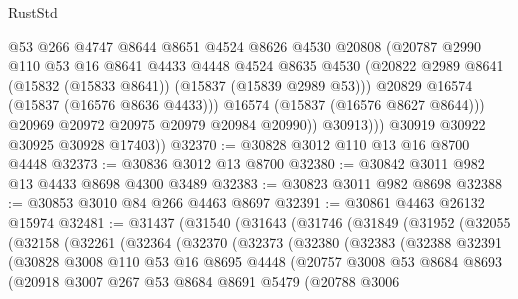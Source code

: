 \begin{lexlean}{RustStd}
\begin{coremodule}
                    @53
                    @266
                    @4747
                    @8644
                    @8651
                    @4524
                    @8626
                    @4530
                    @20808
                    (@20787
                      @2990
                      @110
                      @53
                      @16
                      @8641
                      @4433
                      @4448
                      @4524
                      @8635
                      @4530
                      (@20822 @2989 @8641 (@15832 (@15833 @8641)) (@15837 (@15839 @2989 @53)))
                      @20829
                      @16574
                      (@15837 (@16576 @8636 @4433)))
                    @16574
                    (@15837 (@16576 @8627 @8644)))
                  @20969
                  @20972
                  @20975
                  @20979
                  @20984
                  @20990))
              @30913)))
        @30919
        @30922
        @30925
        @30928
        @17403))
@32370 := @30828 @3012 @110 @13 @16 @8700 @4448
@32373 := @30836 @3012 @13 @8700
@32380 := @30842 @3011 @982 @13 @4433 @8698 @4300 @3489
@32383 := @30823 @3011 @982 @8698
@32388 := @30853 @3010 @84 @266 @4463 @8697
@32391 := @30861 @4463 @26132 @15974
@32481 := @31437
    (@31540
      (@31643
        (@31746
          (@31849
            (@31952
              (@32055
                (@32158
                  (@32261
                    (@32364
                      (@32370
                        (@32373
                          (@32380
                            (@32383
                              (@32388
                                @32391
                                (@30828
                                  @3008
                                  @110
                                  @53
                                  @16
                                  @8695
                                  @4448
                                  (@20757
                                    @3008
                                    @53
                                    @8684
                                    @8693
                                    (@20918
                                      @3007
                                      @267
                                      @53
                                      @8684
                                      @8691
                                      @5479
                                      (@20788
                                        @3006

\end{coremodule}
\end{lexlean}

